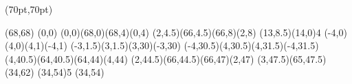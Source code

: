 

\PapierGroesse(70pt,70pt)

\parskip=0pt

\begin{psfigur}(68,68)
\psPin(0,0){
\psPolygon(0,0)(68,0)(68,4)(0,4)
\psPolygon(2,4.5)(66,4.5)(66,8)(2,8)
\psMultipin(13,8.5)(14,0){4}{%
	\psPolygon(-4,0)(4,0)(4,1)(-4,1)
	\psPolygon(-3,1.5)(3,1.5)(3,30)(-3,30)
	\psPolygon(-4,30.5)(4,30.5)(4,31.5)(-4,31.5)
}
\psPolygon(4,40.5)(64,40.5)(64,44)(4,44)
\psPolygon(2,44.5)(66,44.5)(66,47)(2,47)
\psPolygon(3,47.5)(65,47.5)(34,62)
\psKreis[farbe=1,linienstil=-,linienbreite=0.5](34,54){5}
}
\psNeueSchicht
\rpin[pos=c](34,54){}
\end{psfigur}


